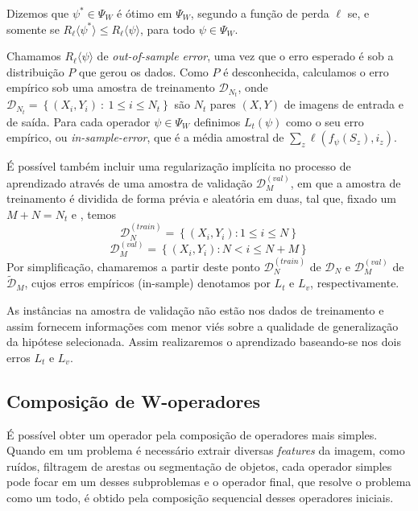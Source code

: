\begin{definition} 
        Dizemos que $\psi^{*} \in \Psi_{W} $ é ótimo em $\Psi_{W}$, segundo a função de perda $\ell$ se, e somente se  $R_{\ell} \langle \psi^{*} \rangle \leq R_{\ell} \langle \psi \rangle$, para todo $\psi \in \Psi_{W} $.
\end{definition}

Chamamos $R_{\ell} \langle \psi \rangle$ de \textit{out-of-sample error}, uma vez que o erro esperado é sob a distribuição $P$ que gerou os dados. Como $P$ é desconhecida, calculamos o erro empírico sob uma amostra de treinamento $\mathcal{D}_{N_{t}}$, onde $\mathcal{D}_{N_{t}} = \left\{ \left( X_{i}, Y_{i} \right) \ : \ 1 \leq i \leq N_{t} \right\}$ são $N_{t}$ pares $(X,Y)$ de imagens de entrada e de saída. Para cada operador $\psi \in \Psi_{W}$ definimos $L_{t}(\psi)$ como o seu erro empírico, ou \textit{in-sample-error}, que é a média amostral de $\sum\limits_{z} \ell \left( f_{\psi} \left( S_{z} \right),i_{z} \right)$.

É possível também incluir uma regularização implícita no processo de aprendizado através de uma amostra de validação $\mathcal{D}_{M}^{(val)}$, em que a amostra de treinamento é dividida de forma prévia e aleatória em duas, tal que, fixado um $M + N = N_{t}$ e , temos
$$\mathcal{D}_{N}^{(train)} = \left\{ (X_{i},Y_{i}): 1 \leq i \leq N \right\}$$
$$\mathcal{D}_{M}^{(val)} = \left\{ (X_{i},Y_{i}): N < i \leq N + M \right\}$$
Por simplificação, chamaremos a partir deste ponto $\mathcal{D}_{N}^{(train)}$ de $\mathcal{D}_{N}$ e $\mathcal{D}_{M}^{(val)}$ de $\tilde{\mathcal{D}}_{M}$, cujos erros empíricos (in-sample) denotamos por $L_{t}$ e $L_{v}$, respectivamente.

As instâncias na amostra de validação não estão nos dados de treinamento e assim fornecem informações com menor viés sobre a qualidade de generalização da hipótese selecionada. Assim realizaremos o aprendizado baseando-se nos dois erros $L_{t}$ e $L_{v}$.


\subsection{Composição de W-operadores}
\label{subsec:compwop}

É possível obter um operador pela composição de operadores mais simples. Quando em um problema é necessário extrair diversas \textit{features} da imagem, como ruídos, filtragem de arestas ou segmentação de objetos, cada operador simples pode focar em um desses subproblemas e o operador final, que resolve o problema como um todo, é obtido pela composição sequencial desses operadores iniciais. 

